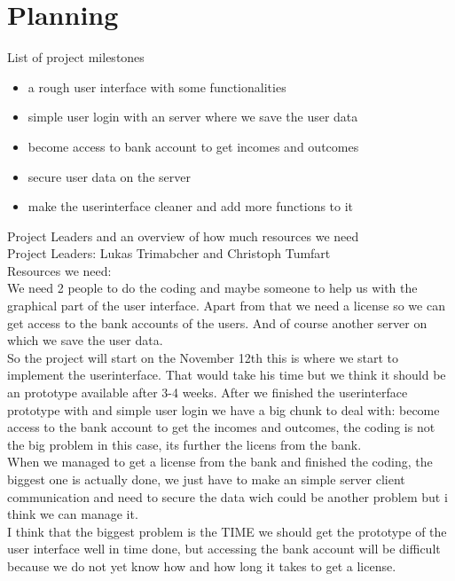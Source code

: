 \documentclass[12pt]{article}
\theoremstyle{definition}
\begin{document}
\pagebreak
\section{Planning}
List of project milestones

\begin{itemize}	
	\item a rough user interface with some functionalities
	\item simple user login with an server where we save the user data
	\item become access to bank account to get incomes and outcomes
	\item secure user data on the server
	\item make the userinterface cleaner and add more functions to it
\end{itemize}

Project Leaders and an overview of how much resources we need
\\

Project Leaders: Lukas Trimabcher and Christoph Tumfart
\\

Resources we need:
\\

We need 2 people to do the coding and maybe someone to help us with the graphical part of the user interface. Apart from that we need a license so we can get access to the bank accounts of the users.
And of course another server on which we save the user data.
\\

So the project will start on the November 12th this is where we start to implement the userinterface. That would take his time but we think it should be an prototype available after 3-4 weeks.
After we finished the userinterface prototype with and simple user login we have a big chunk to deal with: become access to the bank account to get the incomes and outcomes, the coding is not the big problem in this case, its further the licens from the bank.
\\

When we managed to get a license from the bank and finished the coding, the biggest one is actually done, we just have to make an simple server client communication and need to secure the data wich could be another problem but i think we can manage it.
\\

I think that the biggest problem is the TIME we should get the prototype of the user interface well in time done, but accessing the bank account will be difficult because we do not yet know how and how long it takes to get a license.
\end{document}
